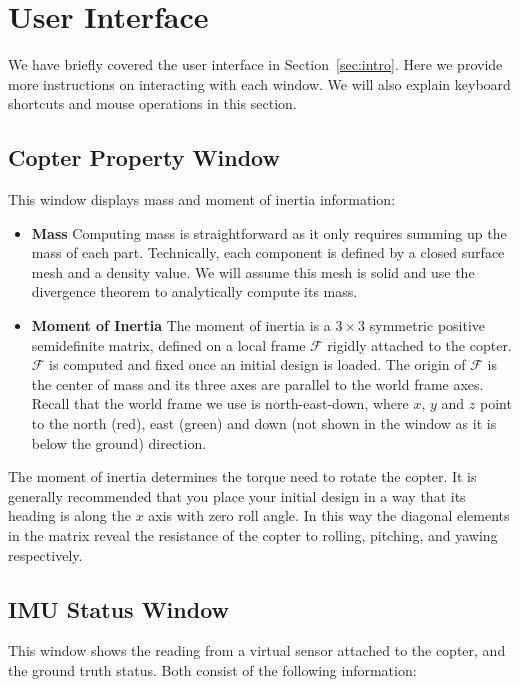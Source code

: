 \clearpage
\section{User Interface}\label{sec:ui}
We have briefly covered the user interface in Section~\ref{sec:intro}. Here we provide more instructions on interacting with each window. We will also explain keyboard shortcuts and mouse operations in this section.

\subsection{Copter Property Window}
This window displays mass and moment of inertia information:

\begin{itemize}
  \item \textbf{Mass} Computing mass is straightforward as it only requires summing up the mass of each part. Technically, each component is defined by a closed surface mesh and a density value. We will assume this mesh is solid and use the divergence theorem to analytically compute its mass. 

  \item \textbf{Moment of Inertia} The moment of inertia is a $3\times3$ symmetric positive semidefinite matrix, defined on a local frame $\mathcal{F}$ rigidly attached to the copter. $\mathcal{F}$ is computed and fixed once an initial design is loaded. The origin of $\mathcal{F}$ is the center of mass and its three axes are parallel to the world frame axes. Recall that the world frame we use is north-east-down, where $x$, $y$ and $z$ point to the north (red), east (green) and down (not shown in the window as it is below the ground) direction.
\end{itemize}

The moment of inertia determines the torque need to rotate the copter. It is generally recommended that you place your initial design in a way that its heading is along the $x$ axis with zero roll angle. In this way the diagonal elements in the matrix reveal the resistance of the copter to rolling, pitching, and yawing respectively.

\subsection{IMU Status Window}
This window shows the reading from a virtual sensor attached to the copter, and the ground truth status. Both consist of the following information:

